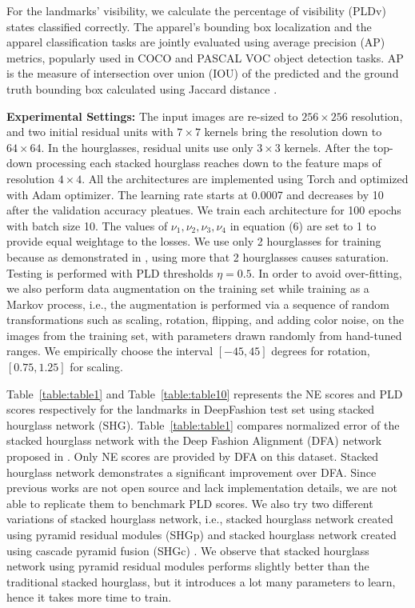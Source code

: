 \documentclass[conference]{IEEEtran}
\begin{document}
For the landmarks' visibility, we calculate the percentage of visibility (PLDv) states classified correctly. The apparel's bounding box localization and the apparel classification tasks are jointly evaluated using average precision (AP) metrics, popularly used in COCO \cite{lin2014microsoft} and PASCAL VOC object \cite{everingham2010pascal}  detection tasks. AP is the measure of intersection over union (IOU) of the predicted and the ground truth bounding box calculated using Jaccard distance \cite{sulaiman2012jaccard}.

\textbf{Experimental Settings:} The input images are re-sized to $256 \times 256$ resolution, and two initial residual units with $7 \times 7$ kernels bring the resolution down to $64 \times 64$. In the hourglasses, residual units use only $3 \times 3$ kernels. After the top-down processing each stacked hourglass reaches down to the feature maps of  resolution $4 \times 4$. All the architectures are implemented using Torch and optimized with Adam optimizer. The learning rate starts at 0.0007 and decreases by 10 after the validation accuracy pleatues. We train each architecture for 100 epochs with batch size 10. The values of $\nu_1, \nu_2, \nu_3, \nu_4$ in equation (6) are set to 1 to provide equal weightage to the losses.
We  use only 2 hourglasses for training because as demonstrated in \cite{xiao2018simple}, using more that 2 hourglasses causes saturation. Testing is performed with PLD thresholds $\eta = 0.5$. 
In order to avoid over-fitting, we also perform data augmentation on the training set while training as a Markov process, i.e., the augmentation is performed via a sequence of random transformations such as scaling, rotation, flipping, and adding color noise, on the images from the training set, with parameters drawn randomly from hand-tuned ranges. We empirically choose the interval $[-45,45]$ degrees for rotation, $[0.75,1.25]$ for scaling.   

 Table~\ref{table:table1} and Table~\ref{table:table10}  represents the NE scores and PLD scores respectively for the landmarks in DeepFashion test set using stacked hourglass network (SHG). Table~\ref{table:table1} compares normalized error of the stacked hourglass network with the Deep Fashion Alignment (DFA) network proposed in \cite{liu2016fashion}. Only NE scores are provided by DFA on this dataset. Stacked hourglass network demonstrates a significant improvement over DFA. Since previous works are not open source and lack implementation details, we are not able to replicate them to benchmark PLD scores. We also try two different variations of stacked hourglass network, i.e., stacked hourglass network created using pyramid residual modules (SHGp) \cite{yang2017learning} and  stacked hourglass network created using cascade pyramid fusion (SHGc) \cite{he2015spatial}. We observe that stacked hourglass network using pyramid residual modules performs slightly better than the traditional stacked hourglass, but it introduces a lot many parameters to learn, hence it takes more time to train.
 
\end{document}
